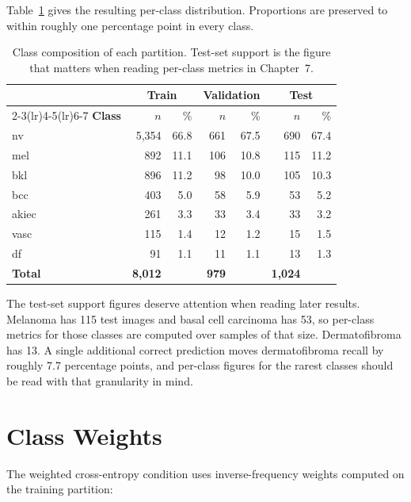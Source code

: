 Table~\ref{tab:split-class} gives the resulting per-class distribution. Proportions are
preserved to within roughly one percentage point in every class.

\begin{table}[htbp]
\centering
\caption{Class composition of each partition. Test-set support is the figure that
matters when reading per-class metrics in Chapter~7.}
\label{tab:split-class}
\small
\begin{tabular}{@{}lrrrrrr@{}}
\toprule
& \multicolumn{2}{c}{\textbf{Train}} & \multicolumn{2}{c}{\textbf{Validation}}
& \multicolumn{2}{c}{\textbf{Test}} \\
\cmidrule(lr){2-3}\cmidrule(lr){4-5}\cmidrule(lr){6-7}
\textbf{Class} & $n$ & \% & $n$ & \% & $n$ & \% \\
\midrule
nv    & 5{,}354 & 66.8 & 661 & 67.5 & 690 & 67.4 \\
mel   &    892 & 11.1 & 106 & 10.8 & 115 & 11.2 \\
bkl   &    896 & 11.2 &  98 & 10.0 & 105 & 10.3 \\
bcc   &    403 &  5.0 &  58 &  5.9 &  53 &  5.2 \\
akiec &    261 &  3.3 &  33 &  3.4 &  33 &  3.2 \\
vasc  &    115 &  1.4 &  12 &  1.2 &  15 &  1.5 \\
df    &     91 &  1.1 &  11 &  1.1 &  13 &  1.3 \\
\midrule
\textbf{Total} & \textbf{8{,}012} & & \textbf{979} & & \textbf{1{,}024} & \\
\bottomrule
\end{tabular}
\end{table}

The test-set support figures deserve attention when reading later results. Melanoma has
115 test images and basal cell carcinoma has 53, so per-class metrics for those classes
are computed over samples of that size. Dermatofibroma has 13. A single additional
correct prediction moves dermatofibroma recall by roughly 7.7 percentage points, and
per-class figures for the rarest classes should be read with that granularity in mind.

\section{Class Weights}
\label{sec:data-weights}

The weighted cross-entropy condition uses inverse-frequency weights computed on the
training partition:

